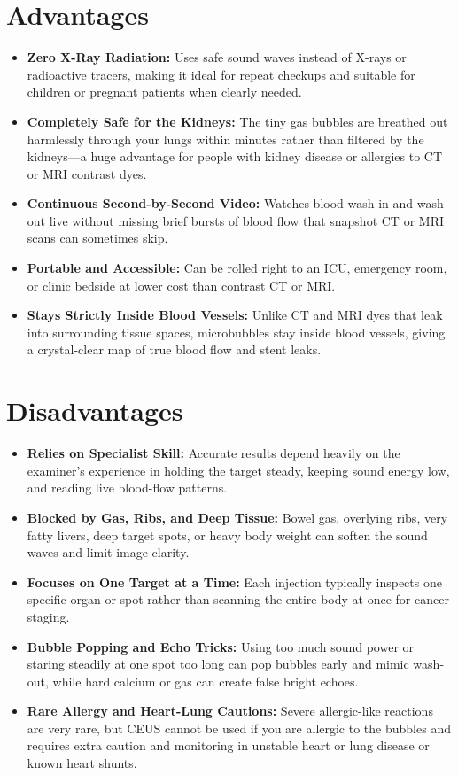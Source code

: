 \section{Advantages}

\begin{itemize}
    \item \textbf{Zero X-Ray Radiation:} Uses safe sound waves instead of X-rays or radioactive tracers, making it ideal for repeat checkups and suitable for children or pregnant patients when clearly needed.
    \item \textbf{Completely Safe for the Kidneys:} The tiny gas bubbles are breathed out harmlessly through your lungs within minutes rather than filtered by the kidneys---a huge advantage for people with kidney disease or allergies to CT or MRI contrast dyes.
    \item \textbf{Continuous Second-by-Second Video:} Watches blood wash in and wash out live without missing brief bursts of blood flow that snapshot CT or MRI scans can sometimes skip.
    \item \textbf{Portable and Accessible:} Can be rolled right to an ICU, emergency room, or clinic bedside at lower cost than contrast CT or MRI.
    \item \textbf{Stays Strictly Inside Blood Vessels:} Unlike CT and MRI dyes that leak into surrounding tissue spaces, microbubbles stay inside blood vessels, giving a crystal-clear map of true blood flow and stent leaks.
\end{itemize}

\section{Disadvantages}

\begin{itemize}
    \item \textbf{Relies on Specialist Skill:} Accurate results depend heavily on the examiner's experience in holding the target steady, keeping sound energy low, and reading live blood-flow patterns.
    \item \textbf{Blocked by Gas, Ribs, and Deep Tissue:} Bowel gas, overlying ribs, very fatty livers, deep target spots, or heavy body weight can soften the sound waves and limit image clarity.
    \item \textbf{Focuses on One Target at a Time:} Each injection typically inspects one specific organ or spot rather than scanning the entire body at once for cancer staging.
    \item \textbf{Bubble Popping and Echo Tricks:} Using too much sound power or staring steadily at one spot too long can pop bubbles early and mimic wash-out, while hard calcium or gas can create false bright echoes.
    \item \textbf{Rare Allergy and Heart-Lung Cautions:} Severe allergic-like reactions are very rare, but CEUS cannot be used if you are allergic to the bubbles and requires extra caution and monitoring in unstable heart or lung disease or known heart shunts.
\end{itemize}

